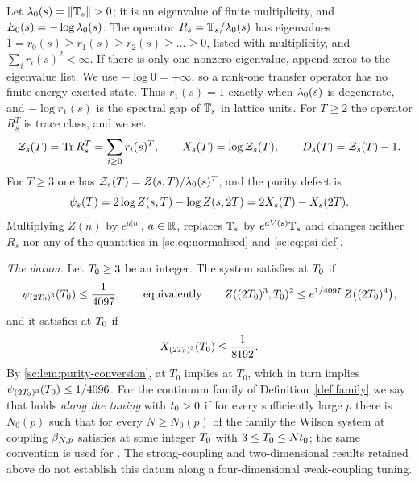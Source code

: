 Let $\lambda_0(s)=\lVert\mathbb T_s\rVert>0$; it is an eigenvalue of finite multiplicity, and $E_0(s)=-\log\lambda_0(s)$. The operator $R_s=\mathbb T_s/\lambda_0(s)$ has eigenvalues $1=r_0(s)\ge r_1(s)\ge r_2(s)\ge\dots\ge0$, listed with multiplicity, and $\sum_ir_i(s)^2<\infty$. If there is only one nonzero eigenvalue, append zeros to the eigenvalue list. We use $-\log0=+\infty$, so a rank-one transfer operator has no finite-energy excited state. Thus $r_1(s)=1$ exactly when $\lambda_0(s)$ is degenerate, and $-\log r_1(s)$ is the spectral gap of $\mathbb T_s$ in lattice units. For $T\ge2$ the operator $R_s^T$ is trace class, and we set
\begin{equation}\label{sc:eq:normalised}
\mathcal Z_{s}(T)=\operatorname{Tr} R_s^T=\sum_{i\ge0}r_i(s)^T,\qquad X_{s}(T)=\log\mathcal Z_{s}(T),\qquad D_{s}(T)=\mathcal Z_{s}(T)-1 .
\end{equation}
For $T\ge3$ one has $\mathcal Z_{s}(T)=Z(s,T)/\lambda_0(s)^T$, and the purity defect is
\begin{equation}\label{sc:eq:psi-def}
\psi_{s}(T)=2\log Z(s,T)-\log Z(s,2T)=2X_{s}(T)-X_{s}(2T).
\end{equation}
Multiplying $Z(n)$ by $e^{a|n|}$, $a\in\mathbb{R}$, replaces $\mathbb T_s$ by $e^{aV(s)}\mathbb T_s$ and changes neither $R_s$ nor any of the quantities in \eqref{sc:eq:normalised} and \eqref{sc:eq:psi-def}.

\smallskip
\noindent\emph{The datum.} Let $T_0\ge3$ be an integer. The system satisfies \Mcirc{} at $T_0$ if
\begin{equation}\label{sc:eq:datum-M}
\psi_{(2T_0)^3}(T_0)\le\frac1{4097},\qquad\text{equivalently}\qquad Z((2T_0)^3,T_0)^2\le e^{1/4097}\,Z\bigl((2T_0)^4\bigr),
\end{equation}
and it satisfies \Bcirc{} at $T_0$ if
\begin{equation}\label{sc:eq:datum-B}
X_{(2T_0)^3}(T_0)\le\frac1{8192} .
\end{equation}
By \cref{sc:lem:purity-conversion}, \Mcirc{} at $T_0$ implies \Bcirc{} at $T_0$, which in turn implies $\psi_{(2T_0)^3}(T_0)\le1/4096$. For the continuum family of Definition~\ref{def:family} we say that \Mcirc{} holds \emph{along the tuning} with $t_0>0$ if for every sufficiently large $p$ there is $N_0(p)$ such that for every $N\ge N_0(p)$ of the family the Wilson system at coupling $\beta_{N,p}$ satisfies \Mcirc{} at some integer $T_0$ with $3\le T_0\le Nt_0$; the same convention is used for \Bcirc{}. The strong-coupling and two-dimensional results retained above do not establish this datum along a four-dimensional weak-coupling tuning.

